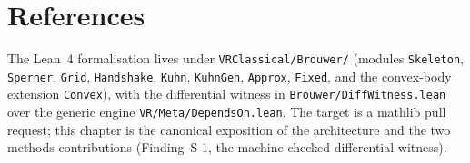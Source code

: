 \section{References}
\label{sec:brouwer_refs}

The Lean~4 formalisation lives under \texttt{VRClassical/Brouwer/} (modules
\texttt{Skeleton}, \texttt{Sperner}, \texttt{Grid}, \texttt{Handshake}, \texttt{Kuhn},
\texttt{KuhnGen}, \texttt{Approx}, \texttt{Fixed}, and the convex-body extension
\texttt{Convex}), with the differential witness in
\texttt{Brouwer/DiffWitness.lean} over the generic engine
\texttt{VR/Meta/DependsOn.lean}.  The target is a mathlib pull request; this chapter is
the canonical exposition of the architecture and the two methods contributions
(Finding~S-1, the machine-checked differential witness).
